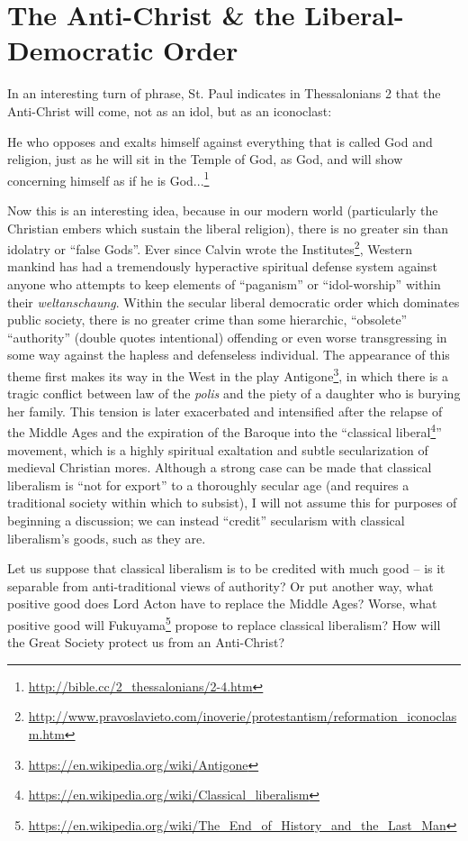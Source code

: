 \section{The Anti-Christ \& the Liberal-Democratic Order}

In an interesting turn of phrase, St. Paul indicates in Thessalonians 2 that the Anti-Christ will come, not as an idol, but as an iconoclast:

\begin{quotex}
He who opposes and exalts himself against everything that is called God and religion, just as he will sit in the Temple of God, as God, and will show concerning himself as if he is God...\footnote{\url{http://bible.cc/2\_thessalonians/2-4.htm}}
\end{quotex}

Now this is an interesting idea, because in our modern world (particularly the Christian embers which sustain the liberal religion), there is no greater sin than idolatry or ``false Gods''. Ever since Calvin wrote the Institutes\footnote{\url{http://www.pravoslavieto.com/inoverie/protestantism/reformation\_iconoclasm.htm}}, Western mankind has had a tremendously hyperactive spiritual defense system against anyone who attempts to keep elements of ``paganism'' or ``idol-worship'' within their
\emph{weltanschaung}. Within the secular liberal democratic order which dominates public society, there is no greater crime than some hierarchic, ``obsolete'' ``authority'' (double quotes intentional) offending or even worse transgressing in some way against the hapless and defenseless individual. The appearance of this theme first makes its way in the West in the play Antigone\footnote{\url{https://en.wikipedia.org/wiki/Antigone}}, in which there is a tragic conflict between law of the \emph{polis} and the piety of a daughter who is burying her family. This tension is later exacerbated and intensified after the relapse of the Middle Ages and the expiration of the Baroque into the ``classical liberal\footnote{\url{https://en.wikipedia.org/wiki/Classical\_liberalism}}'' movement, which is a highly spiritual exaltation and subtle secularization of medieval Christian mores. Although a strong case can be made that classical liberalism is ``not for export'' to a thoroughly secular age (and requires a traditional society within which to subsist), I will not assume this for purposes of beginning a discussion; we can instead ``credit'' secularism with classical liberalism's goods, such as they are.

Let us suppose that classical liberalism is to be credited with much good -- is it separable from anti-traditional views of authority? Or put another way, what positive good does Lord Acton have to replace the Middle Ages? Worse, what positive good will Fukuyama\footnote{\url{https://en.wikipedia.org/wiki/The\_End\_of\_History\_and\_the\_Last\_Man}} propose to replace classical liberalism? How will the Great Society protect us from an Anti-Christ?

